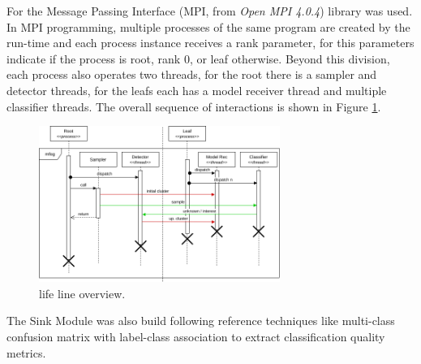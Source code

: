 For \mfog the Message Passing Interface (MPI, from \emph{Open MPI 4.0.4}) library was used.
In MPI programming, multiple processes of the same program are created by the
run-time and each process instance receives a rank parameter, for \mfog this
parameters indicate if the process is root, rank $0$, or leaf otherwise.
Beyond this division, each process also operates two threads, for the root
there is a sampler and detector threads, for the leafs each has a model receiver
thread and multiple classifier threads.
The overall sequence of interactions is shown in Figure \ref{fig:mfog-mpi-life}.

\begin{figure}[htb]
  \centerline{\includegraphics[width=0.7\textwidth]{figures/mfog-arch-mpi.png}}
  \caption{\mfog life line overview.}
  \label{fig:mfog-mpi-life}
\end{figure}

The Sink Module was also build following reference techniques like
multi-class confusion matrix with label-class association
\cite{Faria2016minas}
to extract classification quality metrics.
